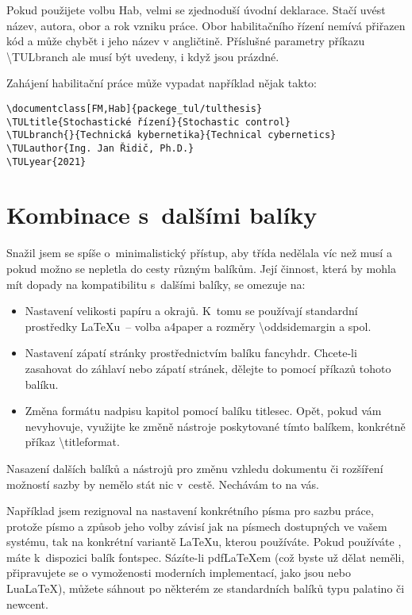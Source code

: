 \documentclass[fonts,numbering,twoside,margins]{./tulpackage/tulthesis}
\makeatletter
\newcommand{\argument}[1]{{\ttfamily\color{\tulcolor}#1}}
\newcommand{\argumentindex}[1]{\argument{#1}\index{#1}}
\newcommand{\prikazneindex}[1]{\argument{\textbackslash #1}}
\newcommand{\prikaz}[1]{\prikazneindex{#1}\index{#1@\textbackslash #1}}
\newenvironment{myquote}{\begin{list}{}{\setlength\leftmargin\parindent}\item[]}{\end{list}}
\newenvironment{listing}{\begin{myquote}\color{\tulcolor}}{\end{myquote}}
\makeatother
\begin{document}
Pokud použijete volbu \argumentindex{Hab}, velmi se zjednoduší úvodní
deklarace. Stačí uvést název, autora, obor a rok vzniku práce. Obor
habilitačního řízení nemívá přiřazen kód a může chybět i jeho název v
angličtině. Příslušné parametry příkazu \prikaz{TULbranch} ale musí být
uvedeny, i když jsou prázdné.

Zahájení habilitační práce může vypadat například nějak takto:

\begin{listing}
\begin{verbatim}
\documentclass[FM,Hab]{packege_tul/tulthesis}
\TULtitle{Stochastické řízení}{Stochastic control}
\TULbranch{}{Technická kybernetika}{Technical cybernetics}
\TULauthor{Ing. Jan Řidič, Ph.D.}
\TULyear{2021}
\end{verbatim}
\end{listing}


\section{Kombinace s~dalšími balíky}

Snažil jsem se spíše o~minimalistický přístup, aby třída nedělala víc než musí
a pokud možno se nepletla do cesty různým balíkům. Její činnost, která by
mohla mít dopady na kompatibilitu s~dalšími balíky, se omezuje na:

\begin{itemize}
\item Nastavení velikosti papíru a okrajů. K~tomu se používají standardní
prostředky \LaTeX u~-- volba \argument{a4paper} a rozměry
\prikazneindex{oddsidemargin} a spol.

\item Nastavení zápatí stránky prostřednictvím balíku \argument{fancyhdr}.
Chcete-li zasahovat do záhlaví nebo zápatí stránek, dělejte to pomocí příkazů
tohoto balíku.

\item Změna formátu nadpisu kapitol pomocí balíku \argument{titlesec}. Opět,
pokud vám nevyhovuje, využijte ke změně nástroje poskytované tímto balíkem,
konkrétně příkaz \prikazneindex{titleformat}.

\end{itemize}

Nasazení dalších balíků a nástrojů pro změnu vzhledu dokumentu či rozšíření
možností sazby by nemělo stát nic v~cestě. Nechávám to na vás.

Například jsem rezignoval na nastavení konkrétního písma pro sazbu práce,
protože písmo a způsob jeho volby závisí jak na písmech dostupných ve vašem
systému, tak na konkrétní variantě \LaTeX u, kterou používáte. Pokud používáte
\XeLaTeX, máte k~dispozici balík \argument{fontspec}. Sázíte-li pdf\-\LaTeX\-em
(což byste už dělat neměli, připravujete se o vymoženosti moderních
implementací, jako jsou \XeLaTeX nebo Lua\LaTeX), můžete sáhnout po některém ze
standardních balíků typu \argument{palatino} či \argument{newcent}.
\end{document}
